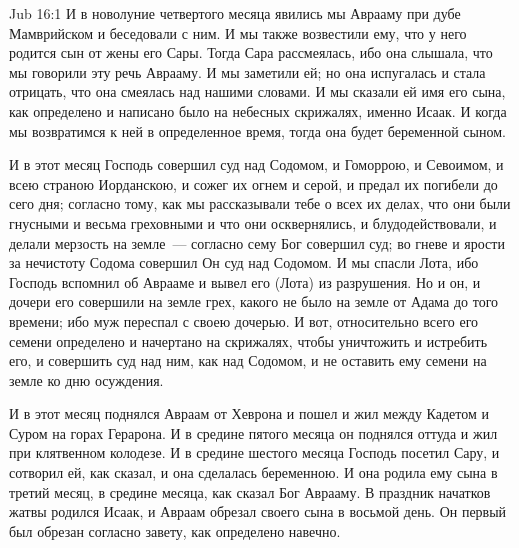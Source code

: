 \vs Jub 16:1
И в новолуние четвертого месяца явились мы
Аврааму при дубе Мамврийском и беседовали с ним.
И мы также возвестили ему, что у него родится сын
от жены его Сары. Тогда Сара рассмеялась, ибо она
слышала, что мы говорили эту речь Аврааму. И мы
заметили ей; но она испугалась и стала отрицать,
что она смеялась над нашими словами. И мы
сказали ей имя его сына, как определено и
написано было на небесных скрижалях, именно
Исаак. И когда мы возвратимся к ней в
определенное время, тогда она будет беременной
сыном.

И в этот месяц Господь совершил суд над Содомом,
и Гоморрою, и Севоимом, и всею страною Иорданскою,
и сожег их огнем и серой, и предал их погибели до
сего дня; согласно тому, как мы рассказывали тебе
о всех их делах, что они были гнусными и весьма
греховными и что они осквернялись, и
блудодействовали, и делали мерзость на земле~---
согласно сему Бог совершил суд; во гневе и ярости
за нечистоту Содома совершил Он суд над Содомом.
И мы спасли Лота, ибо Господь вспомнил об Аврааме
и вывел его (Лота) из разрушения. Но и он, и дочери
его совершили на земле грех, какого не было на
земле от Адама до того времени; ибо муж переспал с
своею дочерью. И вот, относительно всего его
семени определено и начертано на скрижалях,
чтобы уничтожить и истребить его, и совершить суд
над ним, как над Содомом, и не оставить ему семени
на земле ко дню осуждения.

И в этот месяц поднялся Авраам от Хеврона и
пошел и жил между Кадетом и Суром на горах
Герарона. И в средине пятого месяца он поднялся
оттуда и жил при клятвенном колодезе. И в средине
шестого месяца Господь посетил Сару, и сотворил
ей, как сказал, и она сделалась беременною. И она
родила ему сына в третий месяц, в средине месяца,
как сказал Бог Аврааму. В праздник начатков жатвы
родился Исаак, и Авраам обрезал своего сына в
восьмой день. Он первый был обрезан согласно
завету, как определено навечно.


